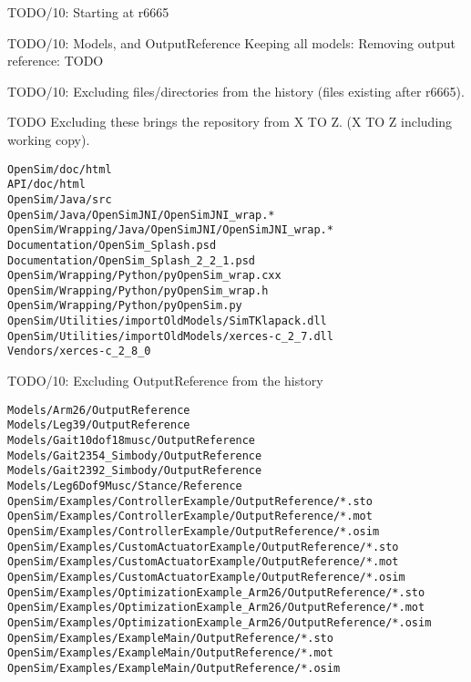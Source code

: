 \documentclass[pdf, 8pt]{beamer}
\def\NUMDECISIONS{10}
\begin{document}
\begin{frame}{TODO/\NUMDECISIONS: Starting at r6665}
\end{frame}

\begin{frame}{TODO/\NUMDECISIONS: Models, and OutputReference}
Keeping all models:
Removing output reference:
TODO
\end{frame}

\begin{frame}[fragile]{TODO/\NUMDECISIONS: Excluding files/directories from the
history (files existing after r6665).}

TODO Excluding these brings the repository from X TO Z. (X TO Z including
working copy).
\begin{Verbatim}
OpenSim/doc/html
API/doc/html
OpenSim/Java/src
OpenSim/Java/OpenSimJNI/OpenSimJNI_wrap.*
OpenSim/Wrapping/Java/OpenSimJNI/OpenSimJNI_wrap.*
Documentation/OpenSim_Splash.psd
Documentation/OpenSim_Splash_2_2_1.psd
OpenSim/Wrapping/Python/pyOpenSim_wrap.cxx
OpenSim/Wrapping/Python/pyOpenSim_wrap.h
OpenSim/Wrapping/Python/pyOpenSim.py
OpenSim/Utilities/importOldModels/SimTKlapack.dll
OpenSim/Utilities/importOldModels/xerces-c_2_7.dll
Vendors/xerces-c_2_8_0
\end{Verbatim}

\end{frame}

\begin{frame}[fragile]{TODO/\NUMDECISIONS: Excluding OutputReference from the history}

\begin{Verbatim}
Models/Arm26/OutputReference
Models/Leg39/OutputReference
Models/Gait10dof18musc/OutputReference
Models/Gait2354_Simbody/OutputReference
Models/Gait2392_Simbody/OutputReference
Models/Leg6Dof9Musc/Stance/Reference
OpenSim/Examples/ControllerExample/OutputReference/*.sto
OpenSim/Examples/ControllerExample/OutputReference/*.mot
OpenSim/Examples/ControllerExample/OutputReference/*.osim
OpenSim/Examples/CustomActuatorExample/OutputReference/*.sto
OpenSim/Examples/CustomActuatorExample/OutputReference/*.mot
OpenSim/Examples/CustomActuatorExample/OutputReference/*.osim
OpenSim/Examples/OptimizationExample_Arm26/OutputReference/*.sto
OpenSim/Examples/OptimizationExample_Arm26/OutputReference/*.mot
OpenSim/Examples/OptimizationExample_Arm26/OutputReference/*.osim
OpenSim/Examples/ExampleMain/OutputReference/*.sto
OpenSim/Examples/ExampleMain/OutputReference/*.mot
OpenSim/Examples/ExampleMain/OutputReference/*.osim
\end{Verbatim}

\end{frame}
\end{document}
